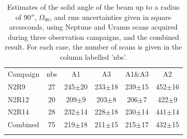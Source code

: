\documentclass[traditionalabstract]{aa}
\newcommand{\rev}[1]{#1}
\begin{document}
{\begin{table}[!h]
\caption{Estimates of the solid angle of the beam up to a radius of
{\rev $90''$, $\Omega_{90}$}, and rms uncertainties given in square
arcseconds, using Neptune and Uranus scans acquired during three
observation campaigns, and the combined result. For each case, the
number of scans is given in the column labelled 'nbs'.}
\label{tab:solid}
\centering
\begin{tabular}{l ccccc}
\hline\hline
\noalign{\smallskip}
Campaign  & nbs & A1 & A3 & A1\&A3 & A2 \\
\noalign{\smallskip}
\hline
\noalign{\smallskip}
N2R9      & 27  &  245$\pm$20    &  233$\pm$18  & 239$\pm$15  & 452$\pm$16 \\
N2R12     & 20  &  209$\pm$9    &  203$\pm$8 &  206$\pm$7   & 422$\pm$9 \\
N2R14     & 28  &  232$\pm$14    &  228$\pm$18 & 230$\pm$14 & 441$\pm$14 \\
Combined  & 75  &  219$\pm$18    &  211$\pm$15   & 215$\pm$17    &  432$\pm$15 \\
\noalign{\smallskip}
\hline
\end{tabular}
\end{table}

%




}
\end{document}
